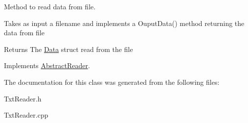 Method to read data from file. 

Takes as input a filename and implements a Ouput\+Data() method returning the data from file

\begin{DoxyReturn}{Returns}
The \hyperlink{struct_data}{Data} struct read from the file 
\end{DoxyReturn}


Implements \hyperlink{class_abstract_reader_a14b05f156920be0cfa0cabdb1c6c1267}{Abstract\+Reader}.



The documentation for this class was generated from the following files\+:\begin{DoxyCompactItemize}
\item 
Txt\+Reader.\+h\item 
Txt\+Reader.\+cpp\end{DoxyCompactItemize}
